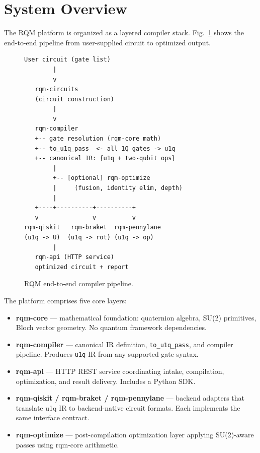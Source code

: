 \documentclass[conference]{IEEEtran}
\begin{document}
\section{System Overview}

The RQM platform is organized as a layered compiler stack. Fig.~\ref{fig:pipeline} shows the
end-to-end pipeline from user-supplied circuit to optimized output.

\begin{figure}[htbp]
\begin{center}
\begin{footnotesize}
\begin{verbatim}
User circuit (gate list)
        |
        v
   rqm-circuits
   (circuit construction)
        |
        v
   rqm-compiler
   +-- gate resolution (rqm-core math)
   +-- to_u1q_pass  <- all 1Q gates -> u1q
   +-- canonical IR: {u1q + two-qubit ops}
        |
        +-- [optional] rqm-optimize
        |     (fusion, identity elim, depth)
        |
   +----+----------+----------+
   v               v          v
rqm-qiskit   rqm-braket  rqm-pennylane
(u1q -> U)  (u1q -> rot) (u1q -> op)
        |
   rqm-api (HTTP service)
   optimized circuit + report
\end{verbatim}
\end{footnotesize}
\end{center}
\caption{RQM end-to-end compiler pipeline.}
\label{fig:pipeline}
\end{figure}

The platform comprises five core layers:

\begin{itemize}
\item \textbf{rqm-core} --- mathematical foundation: quaternion algebra, SU(2) primitives,
Bloch vector geometry. No quantum framework dependencies.
\item \textbf{rqm-compiler} --- canonical IR definition, \texttt{to\_u1q\_pass}, and compiler
pipeline. Produces \texttt{u1q} IR from any supported gate syntax.
\item \textbf{rqm-api} --- HTTP REST service coordinating intake, compilation, optimization,
and result delivery. Includes a Python SDK.
\item \textbf{rqm-qiskit / rqm-braket / rqm-pennylane} --- backend adapters that translate
u1q IR to backend-native circuit formats. Each implements the same interface contract.
\item \textbf{rqm-optimize} --- post-compilation optimization layer applying SU(2)-aware
passes using rqm-core arithmetic.
\end{itemize}
\end{document}
